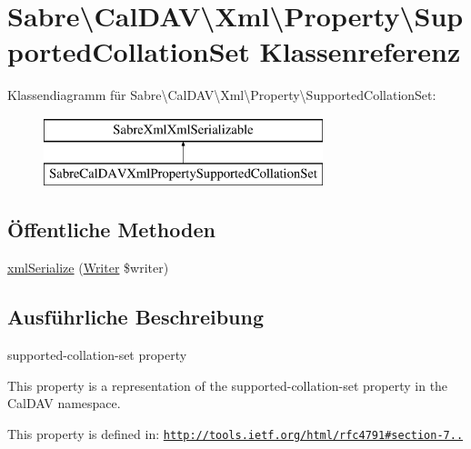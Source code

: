 \hypertarget{class_sabre_1_1_cal_d_a_v_1_1_xml_1_1_property_1_1_supported_collation_set}{}\section{Sabre\textbackslash{}Cal\+D\+AV\textbackslash{}Xml\textbackslash{}Property\textbackslash{}Supported\+Collation\+Set Klassenreferenz}
\label{class_sabre_1_1_cal_d_a_v_1_1_xml_1_1_property_1_1_supported_collation_set}
Klassendiagramm für Sabre\textbackslash{}Cal\+D\+AV\textbackslash{}Xml\textbackslash{}Property\textbackslash{}Supported\+Collation\+Set\+:\begin{figure}[H]
\begin{center}
\leavevmode
\includegraphics[height=2.000000cm]{class_sabre_1_1_cal_d_a_v_1_1_xml_1_1_property_1_1_supported_collation_set}
\end{center}
\end{figure}
\subsection*{Öffentliche Methoden}
\begin{DoxyCompactItemize}
\item 
\mbox{\hyperlink{class_sabre_1_1_cal_d_a_v_1_1_xml_1_1_property_1_1_supported_collation_set_ab5e9f7048ec0723afe382543bdd9282e}{xml\+Serialize}} (\mbox{\hyperlink{class_sabre_1_1_xml_1_1_writer}{Writer}} \$writer)
\end{DoxyCompactItemize}


\subsection{Ausführliche Beschreibung}
supported-\/collation-\/set property

This property is a representation of the supported-\/collation-\/set property in the Cal\+D\+AV namespace.

This property is defined in\+: \href{http://tools.ietf.org/html/rfc4791#section-7.5.1}{\tt http\+://tools.\+ietf.\+org/html/rfc4791\#section-\/7..}

